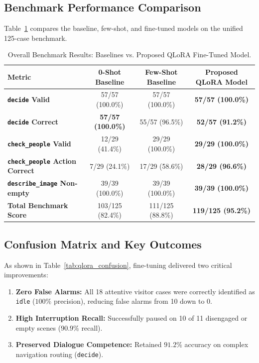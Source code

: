 ﻿\documentclass[11pt,a4paper]{article}
\begin{document}
\subsection{Benchmark Performance Comparison}
Table~\ref{tab:final_results} compares the baseline, few-shot, and fine-tuned models on the unified 125-case benchmark.

\begin{table}[htbp]
\centering
\small
\caption{Overall Benchmark Results: Baselines vs. Proposed QLoRA Fine-Tuned Model.}
\label{tab:final_results}
\begin{tabular*}{\textwidth}{@{\extracolsep{\fill}}lccc@{}}
\toprule
\textbf{Metric} & \textbf{0-Shot Baseline} & \textbf{Few-Shot Baseline} & \textbf{Proposed QLoRA Model} \\
\midrule
\textbf{\texttt{decide} Valid} & 57/57 (100.0\%) & 57/57 (100.0\%) & \textbf{57/57 (100.0\%)} \\
\textbf{\texttt{decide} Correct} & \textbf{57/57 (100.0\%)} & 55/57 (96.5\%) & \textbf{52/57 (91.2\%)} \\
\textbf{\texttt{check\_people} Valid} & 12/29 (41.4\%) & 29/29 (100.0\%) & \textbf{29/29 (100.0\%)} \\
\textbf{\texttt{check\_people} Action Correct} & 7/29 (24.1\%) & 17/29 (58.6\%) & \textbf{28/29 (96.6\%)} \\
\textbf{\texttt{describe\_image} Non-empty} & 39/39 (100.0\%) & 39/39 (100.0\%) & \textbf{39/39 (100.0\%)} \\
\midrule
\textbf{Total Benchmark Score} & 103/125 (82.4\%) & 111/125 (88.8\%) & \textbf{119/125 (95.2\%)} \\
\bottomrule
\end{tabular*}
\end{table}

\subsection{Confusion Matrix and Key Outcomes}
As shown in Table~\ref{tab:qlora_confusion}, fine-tuning delivered two critical improvements:
\begin{enumerate}
    \item \textbf{Zero False Alarms:} All 18 attentive visitor cases were correctly identified as \texttt{idle} ($100\%$ precision), reducing false alarms from 10 down to 0.
    \item \textbf{High Interruption Recall:} Successfully paused on 10 of 11 disengaged or empty scenes ($90.9\%$ recall).
    \item \textbf{Preserved Dialogue Competence:} Retained $91.2\%$ accuracy on complex navigation routing (\texttt{decide}).
\end{enumerate}
\end{document}

